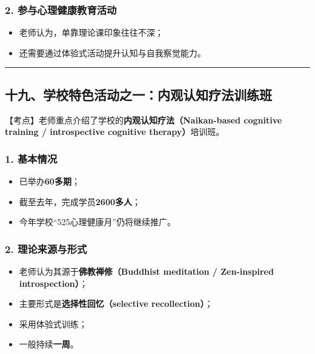 \documentclass[
  chinese,
  9pt,
  a4paper,
]{ctexart}
\providecommand{\tightlist}{%
  \setlength{\itemsep}{0pt}\setlength{\parskip}{0pt}}
\begin{document}
\subsubsection{2.
参与心理健康教育活动}\label{ux53c2ux4e0eux5fc3ux7406ux5065ux5eb7ux6559ux80b2ux6d3bux52a8}

\begin{itemize}
\tightlist
\item
  老师认为，单靠理论课印象往往不深；
\item
  还需要通过体验式活动提升认知与自我察觉能力。
\end{itemize}

\begin{center}\rule{0.5\linewidth}{0.5pt}\end{center}

\subsection{十九、学校特色活动之一：内观认知疗法训练班}\label{ux5341ux4e5dux5b66ux6821ux7279ux8272ux6d3bux52a8ux4e4bux4e00ux5185ux89c2ux8ba4ux77e5ux7597ux6cd5ux8badux7ec3ux73ed}

【考点】老师重点介绍了学校的\textbf{内观认知疗法（Naikan-based cognitive
training / introspective cognitive therapy）}培训班。

\subsubsection{1. 基本情况}\label{ux57faux672cux60c5ux51b5-3}

\begin{itemize}
\tightlist
\item
  已举办\textbf{60多期}；
\item
  截至去年，完成学员\textbf{2600多人}；
\item
  今年学校``525心理健康月''仍将继续推广。
\end{itemize}

\subsubsection{2.
理论来源与形式}\label{ux7406ux8bbaux6765ux6e90ux4e0eux5f62ux5f0f}

\begin{itemize}
\tightlist
\item
  老师认为其源于\textbf{佛教禅修（Buddhist meditation / Zen-inspired
  introspection）}；
\item
  主要形式是\textbf{选择性回忆（selective recollection）}；
\item
  采用体验式训练；
\item
  一般持续\textbf{一周}。
\end{itemize}
\end{document}

